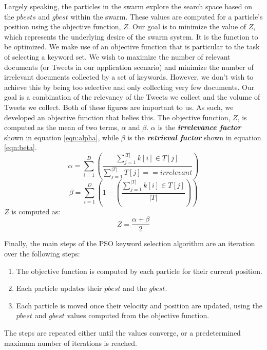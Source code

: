 \documentclass[runningheads]{llncs}
\begin{document}
Largely speaking, the particles in the swarm explore the search space based on the $pbests$ and $gbest$ within the swarm. These values are computed for a particle's position using the objective function, $Z$. Our goal is to minimize the value of $Z$, which represents the underlying desire of the swarm system. It is the function to be optimized. We make use of an objective function that is particular to the task of selecting a keyword set. We wish to maximize the number of relevant documents (or Tweets in our application scenario) and minimize the number of irrelevant documents collected by a set of keywords. However, we don't wish to achieve this by being too selective and only collecting very few documents. Our goal is a combination of the relevancy of the Tweets we collect and the volume of Tweets we collect. Both of these figures are important to us. As such, we developed an objective function that belies this. The objective function, $Z$, is computed as the mean of two terms, $\alpha$ and $\beta$. $\alpha$ is the \textit{\textbf{irrelevance factor}} shown in equation \ref{eqn:alpha}, while $\beta$ is the \textit{\textbf{retrieval factor}} shown in equation \ref{eqn:beta}.
\begin{equation}
	\alpha = \sum_{i=1}^D (\frac{\sum_{j=1}^{|T|}k[i] \in T[j]}{\sum_{j=1}^{|T|}T[j] == irrelevant})
	\label{eqn:alpha}
\end{equation}
\begin{equation}
	\beta = \sum_{i=1}^D (1 - (\frac{\sum_{j=1}^{|T|}k[i] \in T[j]}{|T|}))
	\label{eqn:beta}
\end{equation}{}
$Z$ is computed as:
\begin{equation}
	Z = \frac{\alpha + \beta}{2}
	\label{eqn:objective}
\end{equation}{}

Finally, the main steps of the PSO keyword selection algorithm are an iteration over the following steps:
\begin{enumerate}
	\item The objective function is computed by each particle for their current position.
	\item Each particle updates their $pbest$ and the $gbest$.
	\item Each particle is moved once their velocity and position are updated, using the $pbest$ and $gbest$ values computed from the objective function.
\end{enumerate}
The steps are repeated either until the values converge, or a predetermined maximum number of iterations is reached.
\end{document}
